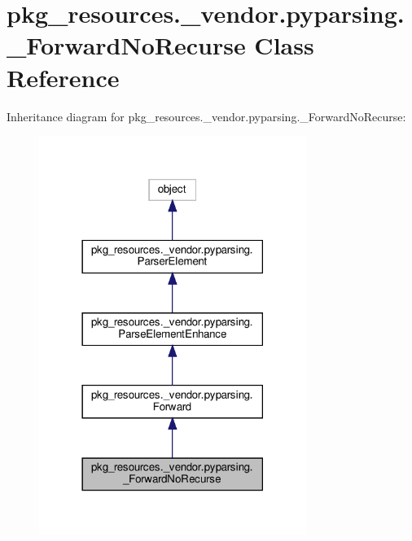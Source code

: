 \hypertarget{classpkg__resources_1_1__vendor_1_1pyparsing_1_1__ForwardNoRecurse}{}\section{pkg\+\_\+resources.\+\_\+vendor.\+pyparsing.\+\_\+\+Forward\+No\+Recurse Class Reference}
\label{classpkg__resources_1_1__vendor_1_1pyparsing_1_1__ForwardNoRecurse}


Inheritance diagram for pkg\+\_\+resources.\+\_\+vendor.\+pyparsing.\+\_\+\+Forward\+No\+Recurse\+:
\nopagebreak
\begin{figure}[H]
\begin{center}
\leavevmode
\includegraphics[width=246pt]{classpkg__resources_1_1__vendor_1_1pyparsing_1_1__ForwardNoRecurse__inherit__graph}
\end{center}
\end{figure}


